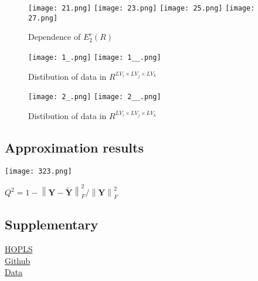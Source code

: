 \documentclass{article}
\begin{document}
\begin{figure}[!htb]
  \texttt{[image: 21.png]}
\endminipage\hfill
{}
  \texttt{[image: 23.png]}
\endminipage\hfill
{}%
  \texttt{[image: 25.png]}
\endminipage
{}%
  \texttt{[image: 27.png]}
\endminipage
\caption{Dependence of $\mathbf{}{E^r_2} (R)$}
\end{figure}

\newpage


\begin{figure}[!htb]
  \texttt{[image: 1\_.png]}
\endminipage\hfill
{}%
  \texttt{[image: 1\_\_.png]}
\endminipage
\caption{Distibution of data in $ R^{LV_i \times LV_j \times LV_k}$}
\end{figure}


\begin{figure}[!htb]
  \texttt{[image: 2\_.png]}
\endminipage\hfill
{}%
  \texttt{[image: 2\_\_.png]}
\endminipage
\caption{Distibution of data in  $ R^{LV_i \times LV_j \times LV_k}$}
\end{figure}

\subsection*{Approximation results}
\texttt{[image: 323.png]}\\

\begin{center}
    

$Q^2 = 1- \left\lVert \mathbf{Y} - \widetilde{\mathbf{Y}} \right\lVert^2_F /\left\lVert \mathbf{Y} \right\lVert^2_F  $
\end{center}
\newpage
\subsection*{Supplementary}
\href{https://arxiv.org/pdf/1207.1230.pdf}{HOPLS} \\
\href{https://github.com/roberts2510/MMoF}{Github}\\
\href{https://www.nature.com/articles/s42005-020-0317-3}{Data}
\end{document}
